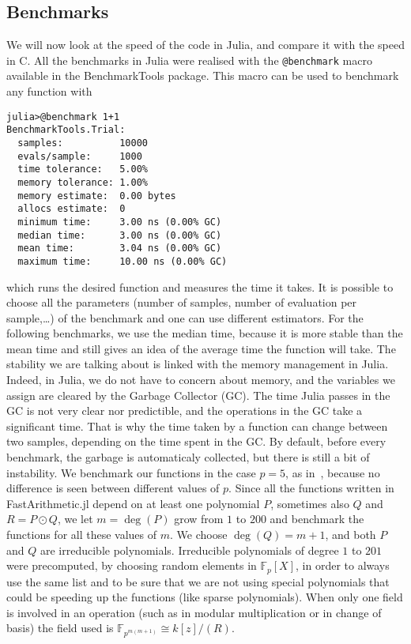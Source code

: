 \documentclass[a4paper,11pt]{article}
\theoremstyle{break}
\theoremstyle{definition}
\theoremstyle{remark}
\begin{document}
\subsection{Benchmarks}
We will now look at the speed of the code in Julia, and compare it with
the speed in C. All the benchmarks in Julia were realised with the
\texttt{@benchmark} macro available in the BenchmarkTools package. This macro
can be used to benchmark any function with 

\begin{verbatim}
julia>@benchmark 1+1
BenchmarkTools.Trial: 
  samples:          10000
  evals/sample:     1000
  time tolerance:   5.00%
  memory tolerance: 1.00%
  memory estimate:  0.00 bytes
  allocs estimate:  0
  minimum time:     3.00 ns (0.00% GC)
  median time:      3.00 ns (0.00% GC)
  mean time:        3.04 ns (0.00% GC)
  maximum time:     10.00 ns (0.00% GC)
\end{verbatim}
which runs the desired function and measures the time it takes. It is possible
to choose all the parameters (number of samples, number of evaluation
per sample,\dots) of the benchmark and one can use different
estimators. For the following benchmarks, we use the median time, because it
is more stable than the mean time and still gives an idea of the average time
the function will take. The stability we are talking about is linked with the
memory management in Julia. Indeed, in Julia, we do not have to concern about
memory, and the variables we assign are cleared by the Garbage Collector
(GC). The time Julia passes in the GC is not very clear nor predictible, and the
operations in the GC take a significant time. That is why the time taken by a
function can change between two samples, depending on the time spent in the GC.
By default, before every benchmark, the garbage is automaticaly collected, but
there is still a bit of instability. We benchmark our functions in the case
$p=5$, as in~\cite{DeDoSc14}, because no difference is seen between different
values of $p$.
Since all the functions written in FastArithmetic.jl depend on at least one
polynomial $P$, sometimes also $Q$ and $R=P\odot Q$, we let $m=\deg (P)$ grow
from $1$ to $200$ and benchmark the functions for all these values of $m$. We
choose $\deg (Q)=m+1$, and both $P$ and $Q$ are irreducible polynomials.
Irreducible polynomials of degree $1$ to $201$ were precomputed, by choosing
random elements in $\mathbb{F}_{p}[X]$, in order to
always use the same list and to be sure that we are not using special
polynomials that could be speeding up the functions (like sparse
polynomials). When only one field is involved in an operation (such as in 
modular multiplication or in change of basis) the field used is 
$\mathbb{F}_{p^{m(m+1)}}\cong k[z]/(R)$.
\end{document}
